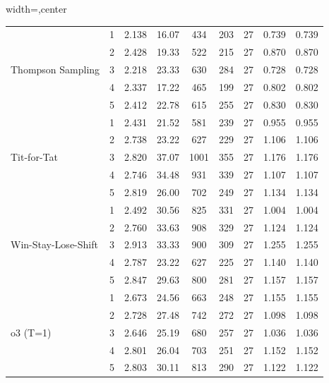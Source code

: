 \begin{table}[htbp]
\begin{adjustbox}{width=\textwidth,center}
\begin{tabular}{|l|c|c|c|c|c|c|c|c|}
\hline
\multirow{5}{*}{Thompson Sampling} & 
1 & 
2.138 & 
16.07 & 
434 & 
203 & 
27 & 
0.739 & 
0.739 \\
 & 
2 & 
2.428 & 
19.33 & 
522 & 
215 & 
27 & 
0.870 & 
0.870 \\
 & 
3 & 
2.218 & 
23.33 & 
630 & 
284 & 
27 & 
0.728 & 
0.728 \\
 & 
4 & 
2.337 & 
17.22 & 
465 & 
199 & 
27 & 
0.802 & 
0.802 \\
 & 
5 & 
2.412 & 
22.78 & 
615 & 
255 & 
27 & 
0.830 & 
0.830 \\
\hline
\multirow{5}{*}{Tit-for-Tat} & 
1 & 
2.431 & 
21.52 & 
581 & 
239 & 
27 & 
0.955 & 
0.955 \\
 & 
2 & 
2.738 & 
23.22 & 
627 & 
229 & 
27 & 
1.106 & 
1.106 \\
 & 
3 & 
2.820 & 
37.07 & 
1001 & 
355 & 
27 & 
1.176 & 
1.176 \\
 & 
4 & 
2.746 & 
34.48 & 
931 & 
339 & 
27 & 
1.107 & 
1.107 \\
 & 
5 & 
2.819 & 
26.00 & 
702 & 
249 & 
27 & 
1.134 & 
1.134 \\
\hline
\multirow{5}{*}{Win-Stay-Lose-Shift} & 
1 & 
2.492 & 
30.56 & 
825 & 
331 & 
27 & 
1.004 & 
1.004 \\
 & 
2 & 
2.760 & 
33.63 & 
908 & 
329 & 
27 & 
1.124 & 
1.124 \\
 & 
3 & 
2.913 & 
33.33 & 
900 & 
309 & 
27 & 
1.255 & 
1.255 \\
 & 
4 & 
2.787 & 
23.22 & 
627 & 
225 & 
27 & 
1.140 & 
1.140 \\
 & 
5 & 
2.847 & 
29.63 & 
800 & 
281 & 
27 & 
1.157 & 
1.157 \\
\hline
\multirow{5}{*}{o3 (T=1)} & 
1 & 
2.673 & 
24.56 & 
663 & 
248 & 
27 & 
1.155 & 
1.155 \\
 & 
2 & 
2.728 & 
27.48 & 
742 & 
272 & 
27 & 
1.098 & 
1.098 \\
 & 
3 & 
2.646 & 
25.19 & 
680 & 
257 & 
27 & 
1.036 & 
1.036 \\
 & 
4 & 
2.801 & 
26.04 & 
703 & 
251 & 
27 & 
1.152 & 
1.152 \\
 & 
5 & 
2.803 & 
30.11 & 
813 & 
290 & 
27 & 
1.122 & 
1.122 \\
\hline
\end{tabular}
\end{adjustbox}
\end{table}

\clearpage
